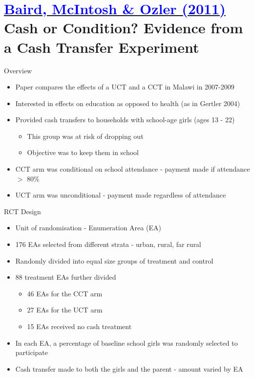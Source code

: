 \documentclass[11pt,notes=hide,aspectratio=169,mathserif]{beamer}
\begin{document}
\section*{\href{https://academic.oup.com/qje/article-abstract/126/4/1709/1922509?login=false}{\textcolor{blue}{Baird, McIntosh \& Ozler (2011)}} \\[5mm] 
\textnormal{\small{Cash or Condition? Evidence from a Cash Transfer Experiment}}}

\begin{frame}{Overview}
\begin{itemize}
\item Paper compares the effects of a UCT and a CCT in Malawi in 2007-2009
\item Interested in effects on education as opposed to health (as in Gertler 2004)
\item Provided cash transfers to households with school-age girls (ages 13 - 22)
\begin{itemize}
    \item This group was at risk of dropping out 
    \item Objective was to keep them in school
\end{itemize}
\item CCT arm was conditional on school attendance - payment made if attendance $>$ 80\%
\item UCT arm was unconditional - payment made regardless of attendance
\end{itemize}
\end{frame}

\begin{frame}{RCT Design}
\begin{itemize}
\item Unit of randomisation - Enumeration Area (EA)
\item 176 EAs selected from different strata - urban, rural, far rural 
\item Randomly divided into equal size groups of treatment and control 
\item 88 treatment EAs further divided 
\begin{itemize}
    \item 46 EAs for the CCT arm
    \item 27 EAs for the UCT arm 
    \item 15 EAs received no cash treatment
\end{itemize}
\item In each EA, a percentage of baseline school girls was randomly selected to participate 
\item Cash transfer made to both the girls and the parent - amount varied by EA 
\end{itemize}
\end{frame}
\end{document}
